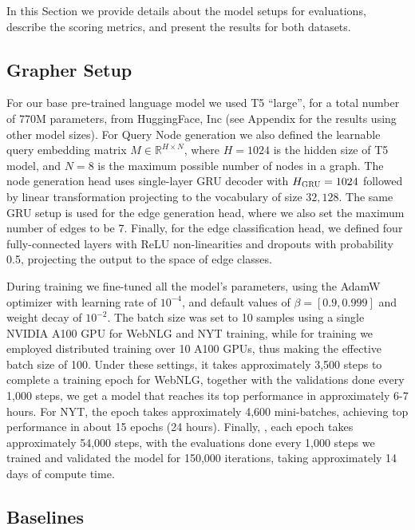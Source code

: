 In this Section we provide details about the model setups for evaluations, describe the scoring metrics, and present the results for both datasets.

\subsection{Grapher Setup}
For our base pre-trained language model we used T5 ``large'', for a total number of 770M parameters, from HuggingFace, Inc \cite{wolf2020transformers} (see Appendix for the results using other model sizes). For Query Node generation we also defined the learnable query embedding matrix $M \in \mathbb{R}^{H \times N}$, where $H = 1024$ is the hidden size of T5 model, and $N = 8$ is the maximum possible number of nodes in a graph. The node generation head uses single-layer GRU decoder with $H_{\textsc{GRU}}=1024$ followed by linear transformation projecting to the vocabulary of size $32,128$. The same GRU setup is used for the edge generation head, where we also set the maximum number of edges to be 7. Finally, for the edge classification head, we defined four fully-connected layers with ReLU non-linearities and dropouts with probability 0.5, projecting the output to the space of edge classes.

During training we fine-tuned all the model's parameters, using the AdamW optimizer with learning rate of $10^{-4}$, and default values of $\beta=[0.9, 0.999]$ and weight decay of $10^{-2}$. The batch size was set to 10 samples using a single NVIDIA A100 GPU for WebNLG and NYT training, while for \tekgen training we employed distributed training over 10 A100 GPUs, thus making the effective batch size of 100. Under these settings, it takes approximately 3,500 steps to complete a training epoch for WebNLG, together with the validations done every 1,000 steps, we get a model that reaches its top performance in approximately 6-7 hours. For NYT, the epoch takes approximately 4,600 mini-batches, achieving top performance in about 15 epochs (24 hours). Finally, \tekgen, each epoch takes approximately 54,000 steps, with the evaluations done every 1,000 steps we trained and validated the model for 150,000 iterations, taking approximately 14 days of compute time. 

\subsection{Baselines}

